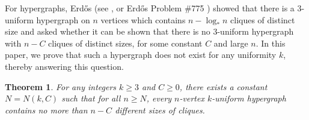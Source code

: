 \documentclass[11pt,a4paper]{article}
\newtheorem{theorem}[definition]{Theorem}
\begin{document}
For hypergraphs, Erd\H{o}s (see \cite{Problem83}, or Erd\H{o}s Problem $\#$775 \cite{BloomErdos775}) showed that there is a 3-uniform hypergraph on $n$ vertices which contains $n- \log_* n$ cliques of distinct size and asked whether it can be shown that there is no 3-uniform hypergraph with $n-C$ cliques of distinct sizes, for some constant $C$ and large $n$. In this paper, we prove that such a hypergraph does not exist for any 
uniformity $k$, thereby answering this question.
\begin{theorem}\label{thm: main}
    For any integers $k \ge 3$ and $C\ge 0$, there exists a constant $N=N(k,C)$ such that for all $n\ge N$, every $n$-vertex $k$-uniform hypergraph contains no more than $n-C$ different sizes of cliques.
\end{theorem}

\end{document}

